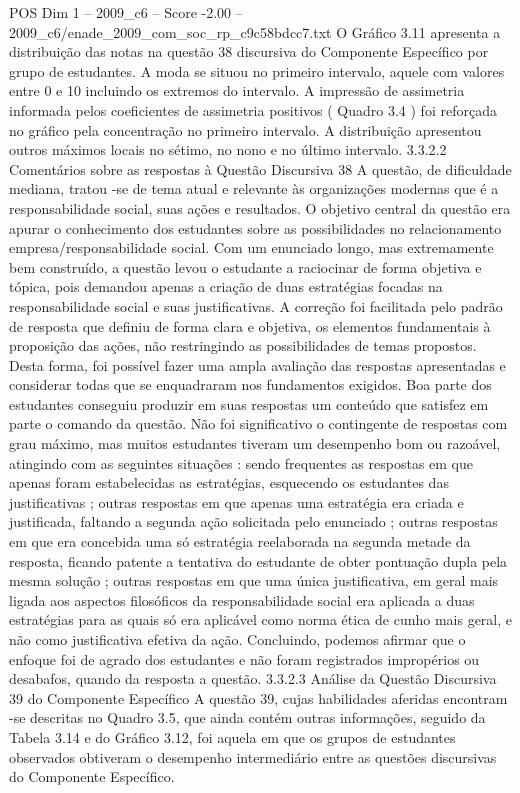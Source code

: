 \begin{textsample}{POS Dim 1 – 2009\_c6 – Score -2.00 – 2009\_c6/enade\_2009\_com\_soc\_rp\_c9c58bdcc7.txt}
O Gráfico 3.11 apresenta a distribuição das notas na questão 38 discursiva do Componente Específico por grupo de estudantes.
A moda se situou no primeiro intervalo, aquele com valores entre 0 e 10 incluindo os extremos do intervalo.
A impressão de assimetria informada pelos coeficientes de assimetria positivos ( Quadro 3.4 ) foi reforçada no gráfico pela concentração no primeiro intervalo.
A distribuição apresentou outros máximos locais no sétimo, no nono e no último intervalo. 3.3.2.2 Comentários sobre as respostas à Questão Discursiva 38 A questão, de dificuldade mediana, tratou -se de tema atual e relevante às organizações modernas que é a responsabilidade social, suas ações e resultados.
O objetivo central da questão era apurar o conhecimento dos estudantes sobre as possibilidades no relacionamento empresa/responsabilidade social.
Com um enunciado longo, mas extremamente bem construído, a questão levou o estudante a raciocinar de forma objetiva e tópica, pois demandou apenas a criação de duas estratégias focadas na responsabilidade social e suas justificativas.
A correção foi facilitada pelo padrão de resposta que definiu de forma clara e objetiva, os elementos fundamentais à proposição das ações, não restringindo as possibilidades de temas propostos.
Desta forma, foi possível fazer uma ampla avaliação das respostas apresentadas e considerar todas que se enquadraram nos fundamentos exigidos.
Boa parte dos estudantes conseguiu produzir em suas respostas um conteúdo que satisfez em parte o comando da questão.
Não foi significativo o contingente de respostas com grau máximo, mas muitos estudantes tiveram um desempenho bom ou razoável, atingindo com as seguintes situações : sendo frequentes as respostas em que apenas foram estabelecidas as estratégias, esquecendo os estudantes das justificativas ; outras respostas em que apenas uma estratégia era criada e justificada, faltando a segunda ação solicitada pelo enunciado ; outras respostas em que era concebida uma só estratégia reelaborada na segunda metade da resposta, ficando patente a tentativa do estudante de obter pontuação dupla pela mesma solução ; outras respostas em que uma única justificativa, em geral mais ligada aos aspectos filosóficos da responsabilidade social era aplicada a duas estratégias para as quais só era aplicável como norma ética de cunho mais geral, e não como justificativa efetiva da ação.
Concluindo, podemos afirmar que o enfoque foi de agrado dos estudantes e não foram registrados impropérios ou desabafos, quando da resposta a questão. 3.3.2.3 Análise da Questão Discursiva 39 do Componente Específico A questão 39, cujas habilidades aferidas encontram -se descritas no Quadro 3.5, que ainda contém outras informações, seguido da Tabela 3.14 e do Gráfico 3.12, foi aquela em que os grupos de estudantes observados obtiveram o desempenho intermediário entre as questões discursivas do Componente Específico.

\end{textsample}

